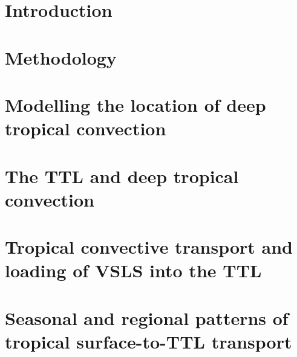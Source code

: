 \documentclass[12pt,a4paper,onesided]{report}
\begin{document}
\fancyhead[RE]{\textit{\thechapter ~ \nouppercase\leftmark}}
\fancyhead[LO]{\textit{\thesection ~ \nouppercase\rightmark}}

\chapter{Introduction}
\label{ch:chapter1}









\chapter{Methodology}
\label{ch:chapter2}




\chapter{Modelling the location of deep tropical convection}
\label{ch:chapter3}






\chapter{The TTL and deep tropical convection}
\label{ch:chapter4}






\chapter{Tropical convective transport and loading of VSLS into the TTL}
\label{ch:chapter5}








\chapter{Seasonal and regional patterns of tropical surface-to-TTL transport}
\label{ch:chapter6}



\end{document}

